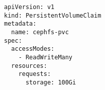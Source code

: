 \begin{verbatim}
apiVersion: v1
kind: PersistentVolumeClaim
metadata:
  name: cephfs-pvc
spec:
  accessModes:
    - ReadWriteMany
  resources:
    requests:
      storage: 100Gi
\end{verbatim}